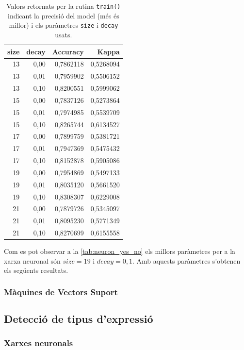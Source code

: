 \documentclass[a4paper]{article}
\begin{document}
\begin{table}[H]
	\centering
	\def\arraystretch{1.2}
	\begin{tabular}{|rrrr|}
		\hline
		size & decay & Accuracy & Kappa \\
		\hline
		13 & 0,00 & 0,7862118 & 0,5268094 \\
		13 & 0,01 & 0,7959902 & 0,5506152 \\
		13 & 0,10 & 0,8200551 & 0,5999062 \\
		15 & 0,00 & 0,7837126 & 0,5273864 \\
		15 & 0,01 & 0,7974985 & 0,5539709 \\
		15 & 0,10 & 0,8265744 & 0,6134527 \\
		17 & 0,00 & 0,7899759 & 0,5381721 \\
		17 & 0,01 & 0,7947369 & 0,5475432 \\
		17 & 0,10 & 0,8152878 & 0,5905086 \\
		19 & 0,00 & 0,7954869 & 0,5497133 \\
		19 & 0,01 & 0,8035120 & 0,5661520 \\
		\rowcolor{Orange!40}
		19 & 0,10 & 0,8308307 & 0,6229008 \\
		21 & 0,00 & 0,7879726 & 0,5345097 \\
		21 & 0,01 & 0,8095230 & 0,5771349 \\
		21 & 0,10 & 0,8270699 & 0,6155558 \\
		\hline
	\end{tabular}
	\captionsetup{width=0.6\textwidth}
	\caption{Valors retornats per la rutina \texttt{train()} indicant la precisió del model (més és millor) i els paràmetres \texttt{size} i \texttt{decay} usats.}
	\label{tab:neuron_yes_no}
\end{table}

Com es pot observar a la \autoref{tab:neuron_yes_no} els millors paràmetres per a la xarxa neuronal són $size = 19$ i $decay = 0,1$. Amb aquests paràmetres s'obtenen els següents resultats.

\subsubsection{Màquines de Vectors Suport}

\subsection{Detecció de tipus d'expressió}
\subsubsection{Xarxes neuronals}
\end{document}
